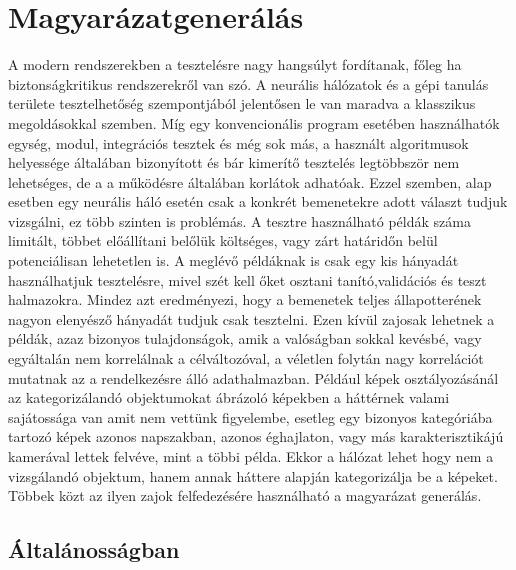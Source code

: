 \chapter{Magyarázatgenerálás}\label{ch:exp}

A modern rendszerekben a tesztelésre nagy hangsúlyt fordítanak, főleg ha biztonságkritikus rendszerekről van szó. A neurális hálózatok és a gépi tanulás területe tesztelhetőség szempontjából jelentősen le van maradva a klasszikus megoldásokkal szemben. Míg egy konvencionális program esetében használhatók egység, modul, integrációs tesztek és még sok más, a használt algoritmusok helyessége általában bizonyított és bár kimerítő tesztelés legtöbbször nem lehetséges, de a a működésre általában korlátok adhatóak. Ezzel szemben, alap esetben egy neurális háló esetén csak a konkrét bemenetekre adott választ tudjuk vizsgálni, ez több szinten is problémás. A tesztre használható példák száma limitált, többet előállítani belőlük költséges, vagy zárt határidőn belül potenciálisan lehetetlen is. A meglévő példáknak is csak egy kis hányadát használhatjuk tesztelésre, mivel szét kell őket osztani tanító,validációs és teszt halmazokra. Mindez azt eredményezi, hogy a bemenetek teljes állapotterének nagyon elenyésző hányadát tudjuk csak tesztelni. Ezen kívül zajosak lehetnek a példák, azaz bizonyos tulajdonságok, amik a valóságban sokkal kevésbé, vagy egyáltalán nem korrelálnak a célváltozóval, a véletlen folytán nagy korrelációt mutatnak az a rendelkezésre álló adathalmazban. Például képek osztályozásánál az kategorizálandó objektumokat ábrázoló képekben a háttérnek valami sajátossága van amit nem vettünk figyelembe, esetleg egy bizonyos kategóriába tartozó képek azonos napszakban, azonos éghajlaton, vagy más karakterisztikájú kamerával lettek felvéve, mint a többi példa. Ekkor a hálózat lehet hogy nem a vizsgálandó objektum, hanem annak háttere alapján kategorizálja be a képeket. Többek közt az ilyen zajok felfedezésére használható a magyarázat generálás.

\section{Általánosságban}

